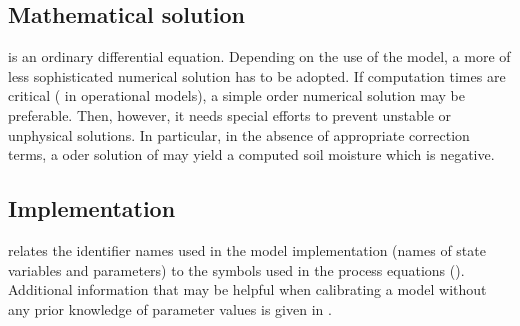 
\subsection{Mathematical solution} \label{sec:runGen4comp_solution}

 is an ordinary differential equation. Depending on the use of the model, a more of less sophisticated numerical solution has to be adopted. If computation times are critical (\eg{} in operational models), a simple \first{} order numerical solution may be preferable. Then, however, it needs special efforts to prevent unstable or unphysical solutions. In particular, in the absence of appropriate correction terms, a \first{} oder solution of  may yield a computed soil moisture \soilWaterContent{} which is negative.


\subsection{Implementation} \label{sec:runGen4comp_implementation}

 relates the identifier names used in the model implementation (names of state variables and parameters) to the symbols used in the process equations (). Additional information that may be helpful when calibrating a model without any prior knowledge of parameter values is given in .

